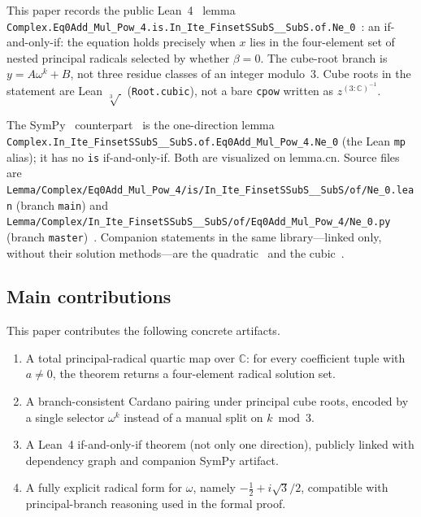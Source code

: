 \documentclass[11pt,a4paper]{article}
\newcommand{\C}{\mathbb{C}}
\begin{document}
This paper records the public Lean~4~\cite{moura2021lean4} lemma
\nolinkurl{Complex.Eq0Add_Mul_Pow_4.is.In_Ite_FinsetSSubS__SubS.of.Ne_0}~\cite{lemma_quartic_lean}:
an if-and-only-if: the equation holds precisely when \(x\) lies in the four-element set of nested principal radicals selected by whether \(\beta=0\).
The cube-root branch is \(y=A\omega^{k}+B\), not three residue classes of an integer modulo~3.
Cube roots in the statement are Lean \(\sqrt[3]{\,}\) (\texttt{Root.cubic}), not a bare \texttt{cpow} written as \(z^{(3:\C)^{-1}}\).

The SymPy~\cite{sympy,meurer2017sympy} counterpart~\cite{lemma_quartic_sympy} is the one-direction lemma
\nolinkurl{Complex.In_Ite_FinsetSSubS__SubS.of.Eq0Add_Mul_Pow_4.Ne_0}
(the Lean \nolinkurl{mp} alias); it has no \nolinkurl{is} if-and-only-if.
Both are visualized on lemma.cn.
Source files are
\nolinkurl{Lemma/Complex/Eq0Add_Mul_Pow_4/is/In_Ite_FinsetSSubS__SubS/of/Ne_0.lean} (branch \nolinkurl{main})
and
\nolinkurl{Lemma/Complex/In_Ite_FinsetSSubS__SubS/of/Eq0Add_Mul_Pow_4/Ne_0.py} (branch \nolinkurl{master})~\cite{lemma_repo}.
Companion statements in the same library---linked only, without their solution methods---are the quadratic~\cite{lemma_quadratic_lean} and the cubic~\cite{lemma_cubic_lean}.

\subsection{Main contributions}
\label{sec:contrib}

This paper contributes the following concrete artifacts.
\begin{enumerate}[leftmargin=1.3em,itemsep=0.2em]
  \item A total principal-radical quartic map over \(\C\): for every coefficient tuple with \(a\neq 0\), the theorem returns a four-element radical solution set.
  \item A branch-consistent Cardano pairing under principal cube roots, encoded by a single selector \(\omega^k\) instead of a manual split on \(k\bmod 3\).
  \item A Lean~4 if-and-only-if theorem (not only one direction), publicly linked with dependency graph and companion SymPy artifact.
  \item A fully explicit radical form for \(\omega\), namely \(-\tfrac12+i\sqrt{3}/2\), compatible with principal-branch reasoning used in the formal proof.
\end{enumerate}
\end{document}
